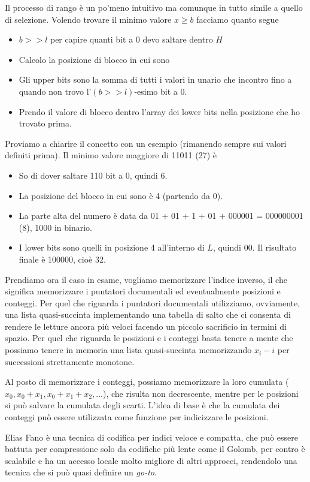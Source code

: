 Il processo di rango è un po'meno intuitivo ma comunque in tutto simile a quello di selezione. Volendo trovare il minimo valore $x \geq b$ facciamo quanto segue
\begin{itemize}
    \item $b >> l$ per capire quanti bit a 0 devo saltare dentro $H$
    \item Calcolo la posizione di blocco in cui sono
    \item Gli upper bits sono la somma di tutti i valori in unario che incontro fino a quando non trovo l'$(b >> l)$-esimo bit a 0.
    \item Prendo il valore di blocco dentro l'array dei lower bits nella posizione che ho trovato prima.
\end{itemize}
Proviamo a chiarire il concetto con un esempio (rimanendo sempre sui valori definiti prima). Il minimo valore maggiore di 11011 (27) è
\begin{itemize}
    \item So di dover saltare 110 bit a 0, quindi 6.
    \item La posizione del blocco in cui sono è 4 (partendo da 0).
    \item La parte alta del numero è data da 01 + 01 + 1 + 01 + 000001 = 000000001 (8), 1000 in binario.
    \item I lower bits sono quelli in posizione 4 all'interno di $L$, quindi 00. Il risultato finale è 100000, cioè 32.
\end{itemize}
Prendiamo ora il caso in esame, vogliamo memorizzare l'indice inverso, il che significa memorizzare i puntatori documentali ed eventualmente posizioni e conteggi. Per quel che riguarda i puntatori documentali utilizziamo, ovviamente, una lista quasi-succinta implementando una tabella di salto che ci consenta di rendere le letture ancora più veloci facendo un piccolo sacrificio in termini di spazio. Per quel che riguarda le posizioni e i conteggi basta tenere a mente che possiamo tenere in memoria una lista quasi-succinta memorizzando $x_i - i$  per successioni strettamente monotone.

Al posto di memorizzare i conteggi, possiamo memorizzare la loro cumulata ($x_0, x_0 + x_1, x_0 + x_1 + x_2, \dots$), che risulta non decrescente, mentre per le posizioni si può salvare la cumulata degli scarti. L'idea di base è che la cumulata dei conteggi può essere utilizzata come funzione per indicizzare le posizioni.

Elias Fano è una tecnica di codifica per indici veloce e compatta, che può essere battuta per compressione solo da codifiche più lente come il Golomb, per contro è scalabile e ha un accesso locale molto migliore di altri approcci, rendendolo una tecnica che si può quasi definire un \textit{go-to}.
